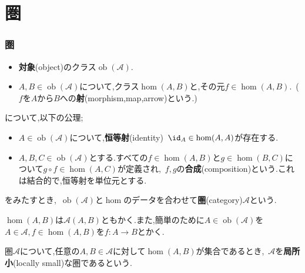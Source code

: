\part[Appendix \thepart, Category theory]{圏}
\section{圏}

\begin{defi}[圏]
	\begin{itemize}
		\item \textbf{対象}(object)のクラス$\operatorname{ob}(\mathscr{A})$.
		\item $A,B\in\operatorname{ob}(\mathscr{A})$について,クラス$\hom (A,B)$と,その元$f\in\hom(A,B).$~($f$を$A$から$B$への\textbf{射}(morphism,map,arrow)という.)
	\end{itemize}
	について,以下の公理;
	\begin{itemize}
		\item $A\in\operatorname{ob}(\mathscr{A})$について,\textbf{恒等射}(identity)~$\id_A\in\hom(A,A)$が存在する.
		\item $A,B,C\in\operatorname{ob}(\mathscr{A})$とする.すべての$f\in\hom(A,B)$と$g\in\hom(B,C)$について$g\circ f\in\hom(A,C)$が定義され,~$f,g$の\textbf{合成}(composition)という.これは結合的で,恒等射を単位元とする.
	\end{itemize}
	をみたすとき,~$\operatorname{ob}(\mathscr{A})$と$\hom$のデータを合わせて\textbf{圏}(category)$\mathscr{A}$という.
\end{defi}

$\hom(A,B)$は$\mathscr{A}(A,B)$ともかく.また,簡単のために$A\in\operatorname{ob}(\mathscr{A})$を$A\in\mathscr{A},f\in\hom(A,B)$を$f:A\to B$とかく.
{
	\makeatletter
	\renewcommand{\symlist}[2]{%
		\mbox{$#1$}%
		\setlength{\m@syu@length}{2.5cm}%
		\settowidth{\m@syu@length@}{\mbox{$#1$}}%
		\addtolength{\m@syu@length}{-\m@syu@length@}%
		\leaders\hbox{\normalfont$\m@th \mkern%
			\@dotsep mu\hbox{.}\mkern \@dotsep mu$}\hskip\m@syu@length
		#2\par
	}%
}
\begin{defi}[局所小]
	圏$\mathscr{A}$について,任意の$A,B\in\mathscr{A}$に対して$\hom(A,B)$が集合であるとき,~$\mathscr{A}$を\textbf{局所小}(locally small)な圏であるという.
\end{defi}

